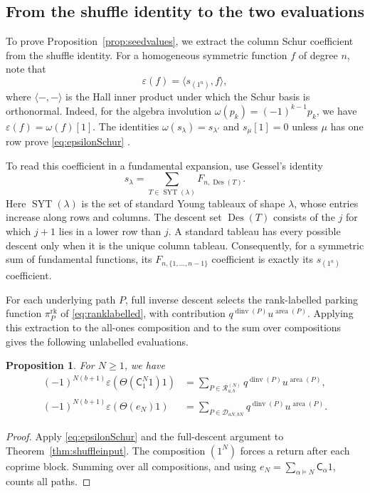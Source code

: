 \documentclass[12pt,reqno]{amsart}
\numberwithin{equation}{section}
\newtheorem{proposition}[theorem]{Proposition}
\theoremstyle{definition}
\theoremstyle{remark}
\theoremstyle{plain}
\DeclareMathOperator{\area}{area}
\DeclareMathOperator{\dinv}{dinv}
\newcommand{\Cop}{\mathsf C}
\newcommand{\Rpaths}{\mathcal R_{a,b}^{(N)}}
\begin{document}
\subsection{From the shuffle identity to the two evaluations}
\label{subsec:signextraction}
To prove Proposition~\ref{prop:seedvalues}, we extract the column Schur coefficient from the shuffle identity.  For a homogeneous symmetric function $f$ of degree $n$, note that
\begin{equation}\label{eq:epsilonSchur}
 \varepsilon(f)=\langle s_{(1^n)},f\rangle,
\end{equation}
where $\langle -,-\rangle$ is the Hall inner product under which the Schur basis is orthonormal.
Indeed, for the algebra involution $\omega(p_k)=(-1)^{k-1}p_k$, we have
$\varepsilon(f)=\omega(f)[1]$.
The identities $\omega(s_\lambda)=s_{\lambda'}$ and
$s_\mu[1]=0$ unless $\mu$ has one row prove
\eqref{eq:epsilonSchur} \cite[Chapter~I, Sections~3--4]{Macdonald}.

To read this coefficient in a fundamental expansion, use Gessel's
identity \cite{Gessel}
\[
 s_\lambda=\sum_{T\in\operatorname{SYT}(\lambda)}F_{n,\operatorname{Des}(T)}.
\]
Here $\operatorname{SYT}(\lambda)$ is the set of standard Young tableaux
of shape $\lambda$, whose entries increase along rows and columns.
The descent set $\operatorname{Des}(T)$ consists of the $j$ for which $j+1$
lies in a lower row than $j$.
A standard tableau has every possible descent only when it is the
unique column tableau.  Consequently, for a symmetric sum of
fundamental functions, its $F_{n,\{1,\ldots,n-1\}}$ coefficient is
exactly its $s_{(1^n)}$ coefficient.

For each underlying path $P$, full inverse descent selects the
rank-labelled parking function $\pi_P^{\mathrm{rk}}$ of
\eqref{eq:ranklabelled}, with contribution $q^{\dinv(P)}u^{\area(P)}$.
Applying this extraction to the all-ones composition and to the sum over
compositions gives the following unlabelled evaluations.

\begin{proposition}\label{prop:unlabelledshuffle}
For $N\ge1$, we have
\begin{align}
 (-1)^{N(b+1)}\varepsilon(\Theta(\Cop_1^N1)1)
   &=\sum_{P\in\Rpaths}q^{\dinv(P)}u^{\area(P)},
       \label{eq:shuffle-return}\\
 (-1)^{N(b+1)}\varepsilon(\Theta(e_N)1)
   &=\sum_{P\in\mathcal D_{aN,bN}}q^{\dinv(P)}u^{\area(P)}.
       \label{eq:shuffle-all}
\end{align}
\end{proposition}
\begin{proof}
Apply \eqref{eq:epsilonSchur} and the full-descent argument to
Theorem~\ref{thm:shuffleinput}.
The composition $(1^N)$ forces a return after each coprime block.
Summing over all compositions, and using
$e_N=\sum_{\alpha\models N}\Cop_\alpha1$, counts all paths.

\end{proof}
\end{document}
